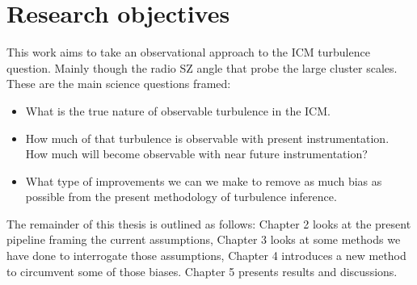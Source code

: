 \section{Research objectives}

This work aims to take an observational approach to the ICM turbulence question. Mainly though the radio SZ angle that probe the large cluster scales. These are the main science questions framed:

\begin{itemize}
	\item What is the true nature of observable turbulence in the ICM.
	\item How much of that turbulence is observable with present instrumentation. How much will become observable with near future instrumentation?
	\item What type of improvements we can we make to remove as much bias as possible from the present methodology of turbulence inference. 
\end{itemize}

The remainder of this thesis is outlined as follows: Chapter 2 looks at the present pipeline framing the current assumptions, Chapter 3 looks at some methods we have done to interrogate those assumptions, Chapter 4 introduces a new method to circumvent some of those biases. Chapter 5 presents results and discussions.